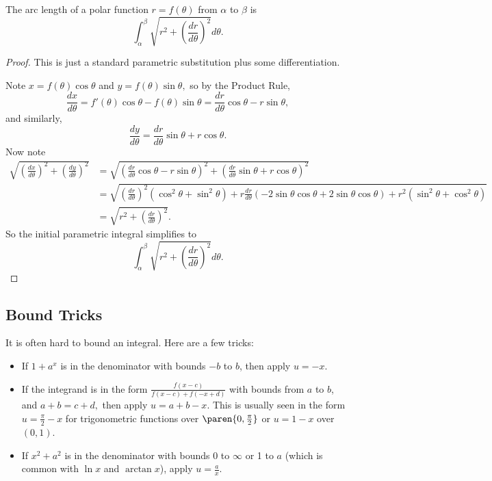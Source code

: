 \documentclass[mast]{lucky}
\begin{document}
\begin{theo}
The arc length of a polar function $r=f(\theta)$ from $\alpha$ to $\beta$ is
\[\int_{\alpha}^{\beta}\sqrt{r^2+\left(\frac{dr}{d\theta}\right)^2}d\theta.\]
\end{theo}

\begin{proof}
This is just a standard parametric substitution plus some differentiation.

Note $x=f(\theta)\cos\theta$ and $y=f(\theta)\sin\theta,$ so by the Product Rule,
\[\frac{dx}{d\theta}=f'(\theta)\cos\theta-f(\theta)\sin\theta=\frac{dr}{d\theta}\cos\theta-r\sin\theta,\]
and similarly,
\[\frac{dy}{d\theta}=\frac{dr}{d\theta}\sin\theta+r\cos\theta.\]
Now note
\begin{align*}
\sqrt{\left(\frac{dx}{d\theta}\right)^2+\left(\frac{dy}{d\theta}\right)^2}&=\sqrt{\left(\frac{dr}{d\theta}\cos\theta-r\sin\theta\right)^2+\left(\frac{dr}{d\theta}\sin\theta+r\cos\theta\right)^2} \\
&=\sqrt{\left(\frac{dr}{d\theta}\right)^2(\cos^2\theta+\sin^2\theta)+r\frac{dr}{d\theta}(-2\sin\theta\cos\theta+2\sin\theta\cos\theta)+r^2(\sin^2\theta+\cos^2\theta)} \\
&=\sqrt{r^2+\left(\frac{dr}{d\theta}\right)^2}.
\end{align*}
So the initial parametric integral simplifies to
\[\int_{\alpha}^{\beta}\sqrt{r^2+\left(\frac{dr}{d\theta}\right)^2}d\theta.\]
\end{proof}


\subsection{Bound Tricks}
It is often hard to bound an integral. Here are a few tricks:
\begin{itemize}
    \item If $1+a^x$ is in the denominator with bounds $-b$ to $b$, then apply $u=-x$.
    \item If the integrand is in the form $\frac{f(x-c)}{f(x-c)+f(-x+d)}$ with bounds from $a$ to $b$, and $a+b=c+d,$ then apply $u=a+b-x$. This is usually seen in the form $u=\frac{\pi}{2}-x$ for trigonometric functions over $\paren{0,\frac{\pi}{2}}$ or $u=1-x$ over $(0,1)$.
    \item If $x^2+a^2$ is in the denominator with bounds 0 to $\infty$ or 1 to $a$ (which is common with $\ln x$ and $\arctan x$), apply $u=\frac{a}{x}$.
\end{itemize}
\end{document}
